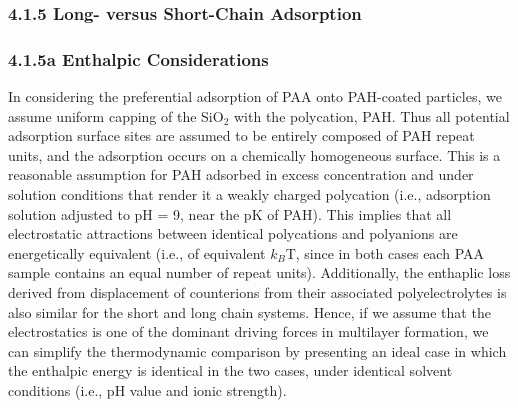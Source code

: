 \documentclass[journal=mamobx,manuscript=article]{achemso}
\begin{document}
\subsubsection{4.1.5 Long- versus Short-Chain Adsorption }

\subsubsection{4.1.5a Enthalpic Considerations}

In considering the preferential adsorption of PAA onto PAH-coated particles, we assume uniform capping of the SiO$_2$ with the polycation, PAH.  Thus all potential adsorption surface sites are assumed to be entirely composed of PAH repeat units, and the adsorption occurs on a chemically homogeneous surface.  This is a reasonable assumption for PAH adsorbed in excess concentration and under solution conditions that render it a weakly charged polycation (i.e., adsorption solution adjusted to pH = 9, near the pK of PAH).\cite{Burke2003,Smith2003}  This implies that all electrostatic attractions between identical polycations and polyanions are energetically equivalent (i.e., of equivalent $k_B$T, since in both cases each PAA sample contains an equal number of repeat units).\cite{Dubas1999}  Additionally, the enthaplic loss derived from displacement of counterions from their associated polyelectrolytes is also similar for the short and long chain systems.  Hence, if we assume that the electrostatics is one of the dominant driving forces in multilayer formation, we can simplify the thermodynamic comparison by presenting an ideal case in which the enthalpic energy is identical in the two cases, under identical solvent conditions (i.e., pH value and ionic strength). 
\end{document}
